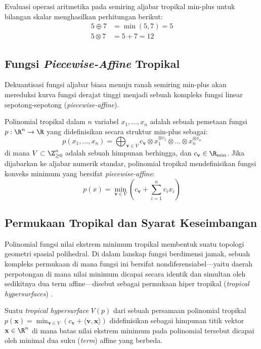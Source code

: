 \begin{contoh}
  Evaluasi operasi aritmetika pada semiring aljabar tropikal min-plus untuk bilangan skalar menghasilkan perhitungan berikut:
  \begin{align*}
    5 \oplus 7  & = \min(5, 7) = 5 \\
    5 \otimes 7 & = 5 + 7 = 12
  \end{align*}
\end{contoh}

\subsection{Fungsi \textit{Piecewise-Affine} Tropikal}
Dekuantisasi fungsi aljabar biasa menuju ranah semiring min-plus akan mereduksi kurva fungsi derajat tinggi menjadi sebuah kompleks fungsi linear sepotong-sepotong (\textit{piecewise-affine}).

\begin{definisi}
  Polinomial tropikal dalam $n$ variabel $x_1, \ldots, x_n$ adalah sebuah pemetaan fungsi $p: \R^n \to \R$ yang didefinisikan secara struktur min-plus sebagai:
  \[
    p(x_1, \ldots, x_n) = \bigoplus_{\mathbf{v} \in V} c_{\mathbf{v}} \otimes x_1^{\otimes v_1} \otimes \ldots \otimes x_n^{\otimes v_n}
  \]
  di mana $V \subset \Z_{\ge 0}^n$ adalah sebuah himpunan berhingga, dan $c_{\mathbf{v}} \in \R_{\min}$. Jika dijabarkan ke aljabar numerik standar, polinomial tropikal mendefinisikan fungsi konveks minimum yang bersifat \textit{piecewise-affine}:
  \[
    p(x) = \min_{\mathbf{v} \in V} \left( c_{\mathbf{v}} + \sum_{i=1}^n v_i x_i \right)
  \]
\end{definisi}

\subsection{Permukaan Tropikal dan Syarat Keseimbangan}
Polinomial fungsi nilai ekstrem minimum tropikal membentuk suatu topologi geometri spasial polihedral. Di dalam lanskap fungsi berdimensi jamak, sebuah kompleks permukaan di mana fungsi ini bersifat nondiferensiabel—yaitu daerah perpotongan di mana nilai minimum dicapai secara identik dan simultan oleh sedikitnya dua term affine—disebut sebagai permukaan hiper tropikal (\textit{tropical hypersurfaces}) \parencite{maclagan2015tropical}.

\begin{definisi}
  Suatu \textit{tropical hypersurface} $V(p)$ dari sebuah persamaan polinomial tropikal $p(\mathbf{x}) = \min_{\mathbf{v} \in V} \left( c_{\mathbf{v}} + \langle \mathbf{v}, \mathbf{x} \rangle \right)$ didefinisikan sebagai himpunan titik vektor $\mathbf{x} \in \R^n$ di mana batas nilai ekstrem minimum pada polinomial tersebut dicapai oleh minimal dua suku (\textit{term}) affine yang berbeda. 
\end{definisi}

